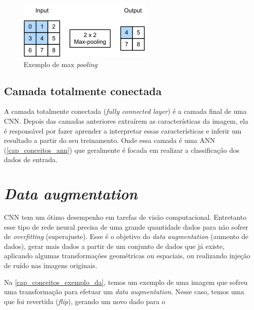 \begin{figure}[htb]
	\caption {\label{exemplo_pooling} Exemplo de max \textit{pooling}}
	\begin{center}
		\includegraphics[scale=1.0]{Imagens/maxpooling}
	\end{center}
\end{figure}

\subsection{Camada totalmente conectada}\label{cap_conceitos_cnn_totalmente}
A camada totalmente conectada (\textit{fully connected layer}) é a camada final de uma CNN.
Depois das camadas anteriores extraírem as características da imagem, ela é responsável por
fazer aprender a interpretar essas características e inferir um resultado a partir do seu treinamento.
Onde essa camada é uma ANN (\autoref{cap_conceitos_ann}) que geralmente é focada em realizar a classificação dos dados
de entrada.

\section{\textit{Data augmentation}}\label{cap_conceitos_data_augmentation}
CNN tem um ótimo desempenho em tarefas de visão computacional. Entretanto esse tipo de rede neural precisa de uma
grande quantidade dados para não sofrer de \textit{overfitting} (superajuste). \cite{shorten2019survey}
Esse é o objetivo do \textit{data augmentation} (aumento de dados), gerar mais dados a partir de um conjunto de dados
que já existe, aplicando algumas transformações geométricas ou espaciais, ou realizando injeção de ruído nas imagens
originais.

Na \autoref{cap_conceitos_exemplo_da}, temos um exemplo de uma imagem que sofreu uma transformação para efetuar um \textit{data augmentation}.
Nesse caso, temos uma que foi revertida (\textit{flip}), gerando um novo dado para o 

